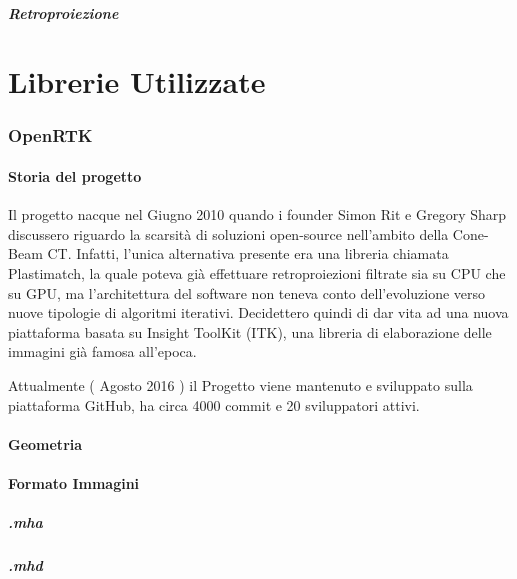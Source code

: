 \documentclass[a4paper,11pt, oneside]{article}
\begin{document}
                \subsubsection{Retroproiezione}
            
               
                        
    \part{Librerie Utilizzate}
        \section{OpenRTK}
            \subsection{Storia del progetto}
                \par 
                    Il progetto nacque nel Giugno 2010 quando i founder Simon Rit e Gregory Sharp discussero riguardo la scarsità di soluzioni open-source nell'ambito della Cone-Beam CT. Infatti, l'unica alternativa presente era una libreria chiamata Plastimatch, la quale poteva già effettuare retroproiezioni filtrate sia su CPU che su GPU, ma l'architettura del software non teneva conto dell'evoluzione verso nuove tipologie di algoritmi iterativi. Decidettero quindi di dar vita ad una nuova piattaforma basata su Insight ToolKit (ITK), una libreria di elaborazione delle immagini già famosa all'epoca.
                \par
                    Attualmente ( Agosto 2016 ) il Progetto viene mantenuto e sviluppato sulla piattaforma GitHub, ha circa 4000 commit e 20 sviluppatori attivi.
            \subsection{Geometria}
            \subsection{Formato Immagini}
                \subsubsection{.mha}
                \subsubsection{.mhd}
            
\end{document}
